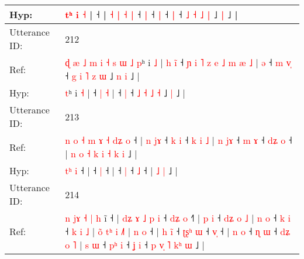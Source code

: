 \documentclass[10pt]{article}
\DeclareRobustCommand{\hl}[1]{{\textcolor{red}{#1}}}
\begin{document}
\begin{longtable}{ll}
 \\
Hyp: & \hl{}\hl{}\hl{}\hl{}\hl{}\hl{t}\hl{ʰ} \hl{i} \hl{˧} |\hl{}\hl{}\hl{}\hl{}\hl{} ˧\hl{}\hl{}\hl{}\hl{}\hl{}\hl{}\hl{}\hl{}\hl{}\hl{}\hl{}\hl{}\hl{} |\hl{}\hl{} \hl{˧} \hl{|} \hl{˧} \hl{|} ˧\hl{}\hl{} \hl{}\hl{|} ˧\hl{}\hl{} \hl{|} ˧\hl{}\hl{} \hl{}\hl{|} ˧\hl{}\hl{} \hl{˩} \hl{˧} \hl{˩} \hl{|} ˩\hl{}\hl{} \hl{|} ˩ |
 \\
\midrule
Utterance ID: & 212 \\
Ref: & \hl{ɖ}\hl{ }\hl{æ}\hl{ }\hl{˩}\hl{ }\hl{m}\hl{ }\hl{i}\hl{ }\hl{˧}\hl{ }\hl{s}\hl{ }\hl{ɯ}\hl{ }\hl{˩}\hl{ }\hl{p}ʰ i \hl{˩} |\hl{ }\hl{h}\hl{ }\hl{i}\hl{̃} ˧\hl{ }\hl{ɲ}\hl{ }\hl{i}\hl{ }\hl{˥}\hl{ }\hl{z}\hl{ }\hl{e}\hl{ }\hl{˩}\hl{ }\hl{m} \hl{æ} \hl{˩} |\hl{ }\hl{ə} ˧\hl{ }\hl{m} \hl{v}\hl{̩} ˧\hl{ }\hl{g} \hl{i} \hl{˥} \hl{z} \hl{ɯ} ˩\hl{ }\hl{n} \hl{i} ˩ |
 \\
Hyp: & \hl{}\hl{}\hl{}\hl{}\hl{}\hl{}\hl{}\hl{}\hl{}\hl{}\hl{}\hl{}\hl{}\hl{}\hl{}\hl{}\hl{}\hl{}\hl{t}ʰ i \hl{˧} |\hl{}\hl{}\hl{}\hl{}\hl{} ˧\hl{}\hl{}\hl{}\hl{}\hl{}\hl{}\hl{}\hl{}\hl{}\hl{}\hl{}\hl{}\hl{}\hl{} \hl{|} \hl{˧} |\hl{}\hl{} ˧\hl{}\hl{} \hl{}\hl{|} ˧\hl{}\hl{} \hl{˩} \hl{˧} \hl{˩} \hl{˧} ˩\hl{}\hl{} \hl{|} ˩ |
 \\
\midrule
Utterance ID: & 213 \\
Ref: & \hl{n}\hl{ }\hl{o}\hl{ }\hl{˧}\hl{ }\hl{m}\hl{ }\hl{ɤ}\hl{ }\hl{˧}\hl{ }\hl{d}\hl{ʑ} \hl{o} ˧ |\hl{ }\hl{n}\hl{ }\hl{j}\hl{ɤ} ˧\hl{ }\hl{k} \hl{i} ˧\hl{ }\hl{k}\hl{ }\hl{i}\hl{ }\hl{˩} |\hl{ }\hl{n}\hl{ }\hl{j}\hl{ɤ} ˧\hl{ }\hl{m} \hl{ɤ} ˧\hl{ }\hl{d}\hl{ʑ} \hl{o} ˧ |\hl{ }\hl{n}\hl{ }\hl{o}\hl{ }\hl{˧}\hl{ }\hl{k}\hl{ }\hl{i}\hl{ }\hl{˧} \hl{k} \hl{i} ˩ |
 \\
Hyp: & \hl{}\hl{}\hl{}\hl{}\hl{}\hl{}\hl{}\hl{}\hl{}\hl{}\hl{}\hl{}\hl{t}\hl{ʰ} \hl{i} ˧ |\hl{}\hl{}\hl{}\hl{}\hl{} ˧\hl{}\hl{} \hl{|} ˧\hl{}\hl{}\hl{}\hl{}\hl{}\hl{} |\hl{}\hl{}\hl{}\hl{}\hl{} ˧\hl{}\hl{} \hl{|} ˧\hl{}\hl{}\hl{} \hl{˩} ˧ |\hl{}\hl{}\hl{}\hl{}\hl{}\hl{}\hl{}\hl{}\hl{}\hl{}\hl{}\hl{} \hl{˩} \hl{|} ˩ |
 \\
\midrule
Utterance ID: & 214 \\
Ref: & \hl{n}\hl{ }\hl{j}\hl{ɤ}\hl{ }\hl{˧}\hl{ }\hl{|}\hl{ }\hl{h} i\hl{̃} ˧ |\hl{ }\hl{d}\hl{ʑ}\hl{ }\hl{ɤ}\hl{ }\hl{˩}\hl{ }\hl{p}\hl{ }\hl{i} ˧\hl{ }\hl{d}\hl{ʑ} \hl{o} ˧\hl{˥} |\hl{ }\hl{p}\hl{ }\hl{i} ˧\hl{ }\hl{d}\hl{ʑ}\hl{ }\hl{o}\hl{ }\hl{˩} |\hl{ }\hl{n}\hl{ }\hl{o} ˧\hl{ }\hl{k} \hl{i} ˧\hl{ }\hl{k}\hl{ }\hl{i}\hl{ }\hl{˩} |\hl{ }\hl{o}\hl{̃}\hl{ }\hl{t}\hl{ʰ}\hl{ }\hl{i} \hl{˩}\hl{˥} |\hl{ }\hl{n}\hl{ }\hl{o} ˧ |\hl{ }\hl{h}\hl{ }\hl{i}\hl{̃} ˧\hl{ }\hl{ʈ}\hl{ʂ}\hl{ʰ} \hl{ɯ} ˧ \hl{v}\hl{̩} ˧ |\hl{ }\hl{n}\hl{ }\hl{o} ˧\hl{ }\hl{ɳ} \hl{ɯ} ˧\hl{ }\hl{d}\hl{ʑ}\hl{ }\hl{o}\hl{ }\hl{˥} |\hl{ }\hl{s}\hl{ }\hl{ɯ} ˧\hl{ }\hl{p}\hl{ʰ} \hl{i} ˧\hl{ }\hl{ʝ} \hl{i} ˧\hl{ }\hl{p} \hl{v}\hl{̩} \hl{˥} \hl{k}\hl{ʰ} \hl{ɯ} ˩ |

\end{longtable}
\end{document}

